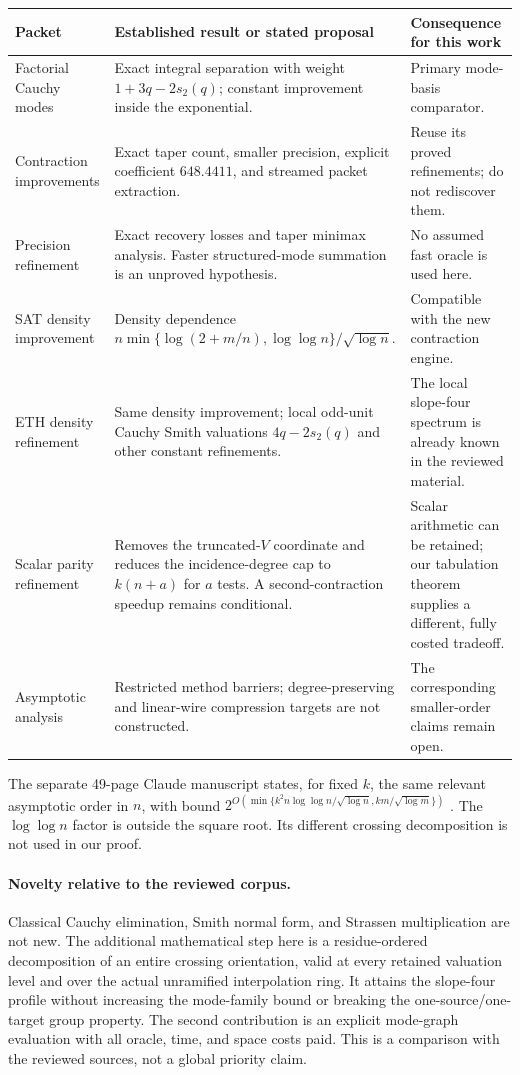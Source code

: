 \documentclass[11pt,letterpaper]{article}
\theoremstyle{definition}\newtheorem{definition}[theorem]{Definition}
\theoremstyle{remark}\newtheorem{remark}[theorem]{Remark}
\begin{document}
\small
\begin{longtable}{@{}>{\raggedright\arraybackslash}p{}>{\raggedright\arraybackslash}p{}>{\raggedright\arraybackslash}p{}@{}}
\toprule
Packet & Established result or stated proposal & Consequence for this work\\
\midrule\endhead
Factorial Cauchy modes & Exact integral separation with weight
$1+3q-2s_2(q)$; constant improvement inside the exponential. & Primary
mode-basis comparator.\\[5pt]
Contraction improvements & Exact taper count, smaller precision,
explicit coefficient $648.4411$, and streamed packet extraction. & Reuse
its proved refinements; do not rediscover them.\\[5pt]
Precision refinement & Exact recovery losses and taper minimax analysis.
Faster structured-mode summation is an unproved hypothesis. & No assumed
fast oracle is used here.\\[5pt]
SAT density improvement & Density dependence
$n\min\{\log(2+m/n),\log\log n\}/\sqrt{\log n}$. & Compatible with the
new contraction engine.\\[5pt]
ETH density refinement & Same density improvement; local odd-unit Cauchy
Smith valuations $4q-2s_2(q)$ and other constant refinements. & The local
slope-four spectrum is already known in the reviewed material.\\[5pt]
Scalar parity refinement & Removes the truncated-$V$ coordinate and reduces
the incidence-degree cap to $k(n+a)$ for $a$ tests. A second-contraction
speedup remains conditional. & Scalar arithmetic can be retained; our
tabulation theorem supplies a different, fully costed tradeoff.\\[5pt]
Asymptotic analysis & Restricted method barriers; degree-preserving and
linear-wire compression targets are not constructed. & The corresponding
smaller-order claims remain open.\\
\bottomrule
\end{longtable}
\normalsize

The separate 49-page Claude manuscript states, for fixed $k$, the same
relevant asymptotic order in $n$, with bound
$2^{O(\min\{k^2n\log\log n/\sqrt{\log n},km/\sqrt{\log m}\})}$
\cite{claude}. The $\log\log n$ factor is outside the square root. Its
different crossing decomposition is not used in our proof.

\paragraph{Novelty relative to the reviewed corpus.}
Classical Cauchy elimination, Smith normal form, and Strassen multiplication
are not new. The additional mathematical step here is a residue-ordered
decomposition of an entire crossing orientation, valid at every retained
valuation level and over the actual unramified interpolation ring. It attains
the slope-four profile without increasing the mode-family bound or breaking
the one-source/one-target group property. The second contribution is an
explicit mode-graph evaluation with all oracle, time, and space costs paid.
This is a comparison with the reviewed sources, not a global priority claim.
\end{document}
